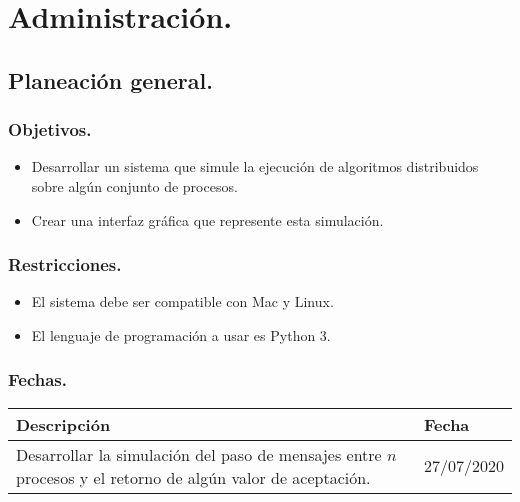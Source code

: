 \documentclass[a4paper,12pt]{article}
\begin{document}
\section{Administración.}
\subsection{Planeación general.}{
\subsubsection{Objetivos.}{
  \begin{itemize}
    \item{Desarrollar un sistema que simule la ejecución de algoritmos
      distribuidos sobre algún conjunto de procesos.}
    \item{Crear una interfaz gráfica que represente esta simulación.}
  \end{itemize}
}
\subsubsection{Restricciones.}{
  \begin{itemize}
    \item{El sistema debe ser compatible con Mac y Linux.}
    \item{El lenguaje de programación a usar es Python 3.}
  \end{itemize}
}
\subsubsection{Fechas.}{
  \begin{center}
  \begin{tabular}{ p{} | p{}}
    Descripción & Fecha \\\hline
    Desarrollar la simulación del paso de mensajes entre $n$ procesos y el
    retorno de algún valor de aceptación. & 27/07/2020\\
  \end{tabular}
  \end{center}
}
}
\end{document}
